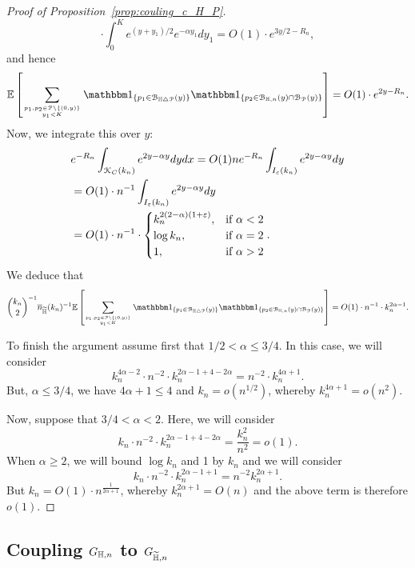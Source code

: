 \begin{proof}[Proof of Proposition~\ref{prop:couling_c_H_P}]
\[	\cdot \int_0^K e^{(y+y_1)/2} 
	e^{-\alpha y_1}   dy_1 = O(1)\cdot e^{3y/2 - R_n}, 
\]
and hence
\begin{align*}
	\Exp { \sum_{p_1,p_2 \in\Pcal \setminus \{(0,y)\} \atop y_1 < K}
	\ind{p_1\in \BallSym{y}} \ind{p_2\in \BallHyp{y}\cap \BallPo{y}}} 
	= O(1) \cdot e^{2y - R_n}.
\end{align*}
Now, we integrate this over $y$: 
\begin{align*}
	&e^{-R_n} \int_{{\mathcal K}_{C}(k_n)} e^{2y -\alpha y} dy dx = O(1) n e^{-R_n} \int_{I_\varepsilon (k_n)} e^{2y -\alpha y} dy \\
	&= O(1) \cdot n^{-1} \int_{I_\varepsilon (k_n)} e^{2y -\alpha y} dy \\
	&= O(1) \cdot n^{-1} \cdot 
		\begin{cases}
		k_n^{2(2-\alpha) (1+\varepsilon)}, & \mbox{if $\alpha < 2$} \\
		\log k_n, & \mbox{if $\alpha =2$} \\
		1, & \mbox{if $\alpha >2$}
		\end{cases}.
\end{align*}
We deduce that
\[
	\binom{k_n}{2}^{-1} \expH^{-1} \Exp { \sum_{p_1,p_2 \in\Pcal \setminus \{(0,y)\} \atop y_1 < K}
	\ind{p_1\in \BallSym{y}} \ind{p_2\in \BallHyp{y}\cap \BallPo{y}}}
	= O(1) \cdot n^{-1} \cdot k_n^{2\alpha -1}.
\]

To finish the argument assume first that $1/2 <\alpha \leq 3/4$. In this case, we will consider
\[
	k_n^{4\alpha -2} \cdot n^{-2} \cdot k_n^{2\alpha -1 + 4 - 2\alpha} = 
	n^{-2} \cdot k_n^{4\alpha +1}.
\]
But, $\alpha \leq 3/4$, we have $4\alpha +1 \leq 4$ and $k_n = o(n^{1/2})$, whereby $k_n^{4\alpha +1} = o(n^{2})$. 

Now, suppose that $3/4 < \alpha < 2$. Here, we will consider 
\[
	k_n \cdot n^{-2} \cdot k_n^{2\alpha -1 + 4 - 2\alpha} =\frac{k_n^2}{n^2} = o(1).
\] 
When $\alpha \geq 2$, we will bound $\log k_n$ and 1 by $k_n$ and we will consider 
\[
	k_n \cdot n^{-2} \cdot k_n^{2\alpha -1 +1}= n^{-2} k_n^{2\alpha +1}.
\] 
But $k_n = O(1)\cdot n^{\frac{1}{2\alpha +1}}$, whereby $k_n^{2\alpha +1} =O(n)$ and 
the above term is therefore $o(1)$.

\end{proof}

\subsection{Coupling $G_{\mathbb{H},n}$ to $G_{\widetilde{\mathbb{H}},n}$}\label{ssec:coupling_H_HP}

